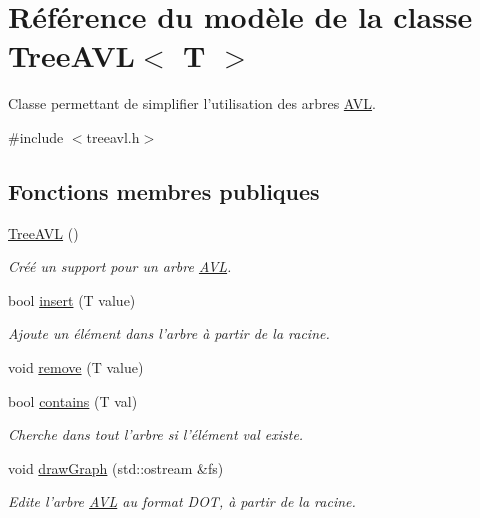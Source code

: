 \hypertarget{class_tree_a_v_l}{\section{Référence du modèle de la classe Tree\+A\+V\+L$<$ T $>$}
\label{class_tree_a_v_l}
}


Classe permettant de simplifier l'utilisation des arbres \hyperlink{class_a_v_l}{A\+V\+L}.  




{\ttfamily \#include $<$treeavl.\+h$>$}

\subsection*{Fonctions membres publiques}
\begin{DoxyCompactItemize}
\item 
\hyperlink{class_tree_a_v_l_a43c4c69a41c5dc84010d2a265def4120}{Tree\+A\+V\+L} ()
\begin{DoxyCompactList}\small\item\em Créé un support pour un arbre \hyperlink{class_a_v_l}{A\+V\+L}. \end{DoxyCompactList}\item 
bool \hyperlink{class_tree_a_v_l_ad815e21378bcaf35201a786fa0921a73}{insert} (T value)
\begin{DoxyCompactList}\small\item\em Ajoute un élément dans l'arbre à partir de la racine. \end{DoxyCompactList}\item 
void \hyperlink{class_tree_a_v_l_a5cc713f2b30f0de6cd24b850f51eb383}{remove} (T value)
\item 
bool \hyperlink{class_tree_a_v_l_a7f5167c9fbbbb74301698fb96194d66d}{contains} (T val)
\begin{DoxyCompactList}\small\item\em Cherche dans tout l'arbre si l'élément val existe. \end{DoxyCompactList}\item 
void \hyperlink{class_tree_a_v_l_a55eceb0c95a94a590bd07d2e2c59ff14}{draw\+Graph} (std\+::ostream \&fs)
\begin{DoxyCompactList}\small\item\em Edite l'arbre \hyperlink{class_a_v_l}{A\+V\+L} au format D\+O\+T, à partir de la racine. \end{DoxyCompactList}\item 

\end{DoxyCompactItemize}
